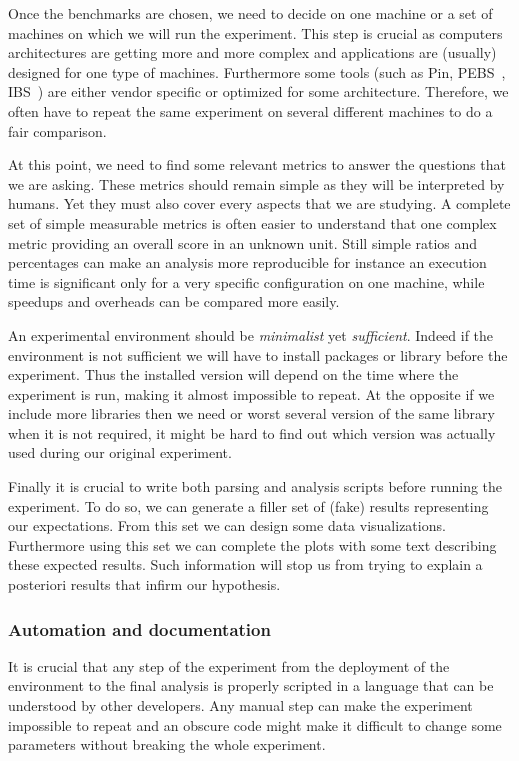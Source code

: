 Once the benchmarks are chosen, we need to decide on one machine or a set of machines on which we will run the experiment.
This step is crucial as computers architectures are getting more and more complex  and applications are (usually) designed for one type of machines.
Furthermore some tools (such as \gls{Pin}, \gls{PEBS}~\cite{Levinthal09Performance}, \gls{IBS}~\cite{Drongowski07Instructionbased}) are either vendor specific or optimized for some architecture.
Therefore, we often have to repeat the same experiment on several different machines to do a fair comparison.

At this point, we need to find some relevant metrics to answer the questions that we are asking.
These metrics should remain simple as they will be interpreted by humans.
Yet they must also cover every aspects that we are studying.
A complete set of simple measurable metrics is often easier to understand that one complex metric providing an overall score in an unknown unit.
Still simple ratios and percentages can make an analysis more reproducible for instance an execution time is significant only for a very specific configuration on one machine, while speedups and overheads can be compared more easily.

An experimental environment should be \emph{minimalist} yet \emph{sufficient}.
Indeed if the environment is not sufficient we will have to install packages or library before the experiment.
Thus the installed version will depend on the time where the experiment is run, making it almost impossible to repeat.
At the opposite if we include more libraries then we need or worst several version of the same library when it is not required, it might be hard to find out which version was actually used during our original experiment.

Finally it is crucial to write both parsing and analysis scripts before running the experiment.
To do so, we can generate a filler set of (fake) results representing our expectations.
From this set we can design some data visualizations.
Furthermore using this set we can complete the plots with some text describing these expected results.
Such information will stop us from trying to explain a posteriori results that infirm our hypothesis.

\subsubsection{Automation and documentation}

It is crucial that any step of the experiment from the deployment of the environment to the final analysis is properly scripted in a language that can be understood by other developers.
Any manual step can make the experiment impossible to repeat and an obscure code might make it difficult to change some parameters without breaking the whole experiment.


